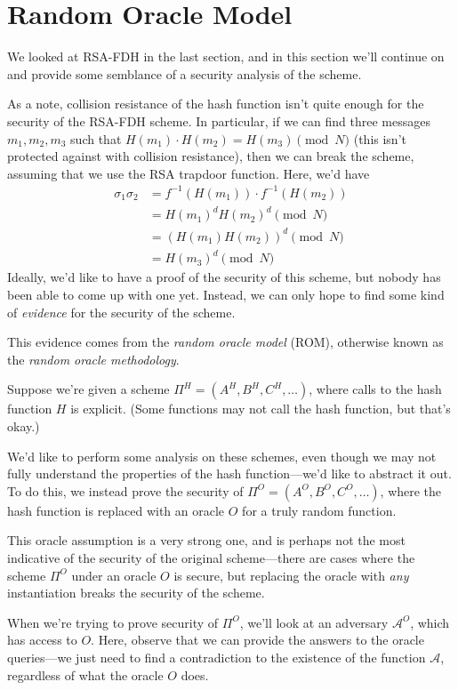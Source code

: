\section{Random Oracle Model}

We looked at RSA-FDH in the last section, and in this section we'll continue on and provide some semblance of a security analysis of the scheme.

As a note, collision resistance of the hash function isn't quite enough for the security of the RSA-FDH scheme. In particular, if we can find three messages $m_1, m_2, m_3$ such that $H(m_1) \cdot H(m_2) = H(m_3) \pmod{N}$ (this isn't protected against with collision resistance), then we can break the scheme, assuming that we use the RSA trapdoor function. Here, we'd have
\begin{align*}
    \sigma_1 \sigma_2 &= f^{-1}(H(m_1)) \cdot f^{-1}(H(m_2)) \\
                      &= H(m_1)^d H(m_2)^d \pmod{N} \\
                      &= (H(m_1) H(m_2))^d \pmod{N} \\
                      &= H(m_3)^d \pmod{N}
\end{align*}
Ideally, we'd like to have a proof of the security of this scheme, but nobody has been able to come up with one yet. Instead, we can only hope to find some kind of \emph{evidence} for the security of the scheme.

This evidence comes from the \emph{random oracle model} (ROM), otherwise known as the \emph{random oracle methodology}.

Suppose we're given a scheme $\Pi^H = (A^H, B^H, C^H, \ldots)$, where calls to the hash function $H$ is explicit. (Some functions may not call the hash function, but that's okay.)

We'd like to perform some analysis on these schemes, even though we may not fully understand the properties of the hash function---we'd like to abstract it out. To do this, we instead prove the security of $\Pi^O = (A^O, B^O, C^O, \ldots)$, where the hash function is replaced with an oracle $O$ for a truly random function.

This oracle assumption is a very strong one, and is perhaps not the most indicative of the security of the original scheme---there are cases where the scheme $\Pi^O$ under an oracle $O$ is secure, but replacing the oracle with \emph{any} instantiation breaks the security of the scheme.

When we're trying to prove security of $\Pi^O$, we'll look at an adversary $\mathcal{A}^O$, which has access to $O$. Here, observe that we can provide the answers to the oracle queries---we just need to find a contradiction to the existence of the function $\mathcal{A}$, regardless of what the oracle $O$ does.

